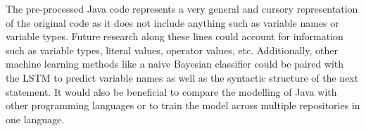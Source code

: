 \documentclass{article}
\begin{document}
The pre-processed Java code represents a very general and cursory
representation of the original code as it does not include anything such
as variable names or variable types. Future research along these lines
could account for information such as variable types, literal values,
operator values, etc. Additionally, other machine learning methods like
a naive Bayesian classifier could be paired with the LSTM to predict
variable names as well as the syntactic structure of the next statement.
It would also be beneficial to compare the modelling of Java with other
programming languages or to train the model across multiple repositories
in one language.








%
\end{document}
